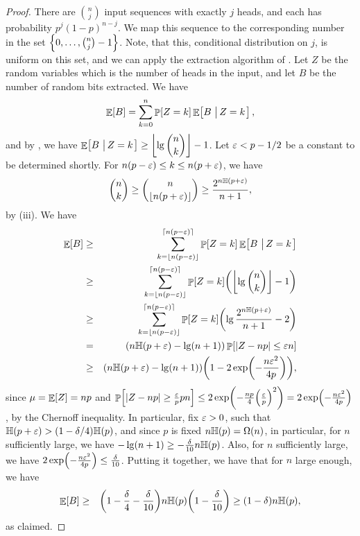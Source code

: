 \begin{proof}
    There are $\binom{n}{j}$ input sequences with exactly $j$ heads,
    and each has probability $p^{j}(1-p)^{n-j}$. We map this sequence
    to the corresponding number in the set $\left\{ {0,\ldots,
       \binom{n}{j}-1} \right\}$. Note, that this, conditional distribution on
    $j$, is uniform on this set, and we can apply the extraction
    algorithm of . Let $Z$ be the random variables
    which is the number of heads in the input, and let $B$ be the
    number of random bits extracted. We have
    \begin{equation*}
        \Ex{B} = \sum_{k=0}^n \Prob{Z = k } \Ex{B \sep{ Z = k }},
    \end{equation*}
    and by , we have $\displaystyle \mathop{\mathbb{E}}\!\left[ {B \,\left|\, {Z = k
       } \bigr.\right.} \right] \geq \left\lfloor { \lg \binom{n}{k}} \right\rfloor -1 $. Let ${\varepsilon} < p-1/2$ be a
    constant to be determined shortly. For $n(p-{\varepsilon}) \leq k \leq n (p
    +{\varepsilon})$, we have
    \[
    \binom{n}{k} \geq \binom{n}{\floor{ n(p+\eps)} } \geq \frac{2^{n
          \Entropy{p+\eps} }}{n+1},
    \]
    by  (iii). We have
    \begin{eqnarray*}
        \Ex{B} &\geq &
        \sum_{k=\floor{n(p-\eps)}}^{\ceil{n(p-\eps)}}
        \Prob{Z = k } \Ex{B \sep{ Z = k }} \\
        &\geq &
        \sum_{k=\floor{n(p-\eps)}}^{\ceil{n(p-\eps)}}
        \Prob{Z = k } \pth{\floor{ \lg \binom{n}{k}} -1 }\\
        &\geq &
        \sum_{k=\floor{n(p-\eps)}}^{\ceil{n(p-\eps)}}
        \Prob{Z = k } \pth{\lg \frac{2^{n
                 \Entropy{p+\eps} }}{n+1} -2 }\\
        &= &
        \pth{ n  \Entropy{p+\eps} - \lg(n+1) } \Prob{ \cardin{Z - np}
           \leq \eps n } \\
        &\geq &
        \pth{ n  \Entropy{p+\eps} - \lg (n+1) }
        \pth{1 - 2\exp \pth{
           -\frac{n\eps^2}{4p} }},
    \end{eqnarray*}
    since $\mu = \mathop{\mathbb{E}}\!\left[ {Z} \right] = np$ and $\Prob{ \cardin{Z - np} \geq
       \frac{\eps}{p} p n } \leq 2\exp \pth{ -\frac{np}{4}
       \pth{\frac{\eps}{p}}^2 } = 2\exp \pth{ -\frac{n\eps^2}{4p} } $,
    by the Chernoff inequality. In particular, fix ${\varepsilon} > 0 $, such
    that $\Entropy{p+\eps} > (1-\delta/4) \Entropy{p}$, and since $p$
    is fixed $n \Entropy{p} = \Omega(n)$, in particular, for $n$
    sufficiently large, we have $- \lg\pth{n+1}\geq -
    \frac{\delta}{10}n \Entropy{p}$. Also, for $n$ sufficiently large,
    we have $2\exp \pth{ -\frac{n\eps^2}{4p} } \leq
    \frac{\delta}{10}$. Putting it together, we have that for $n$
    large enough, we have
    \begin{eqnarray*}
        \Ex{B} &\geq &
        \pth{ 1-\frac{\delta}{4}  - \frac{\delta}{10} } n   \Entropy{p}
        \pth{1 - \frac{\delta}{10} } \geq \pth{ 1- \delta} n \Entropy{p},
    \end{eqnarray*}
    as claimed.


\end{proof}
